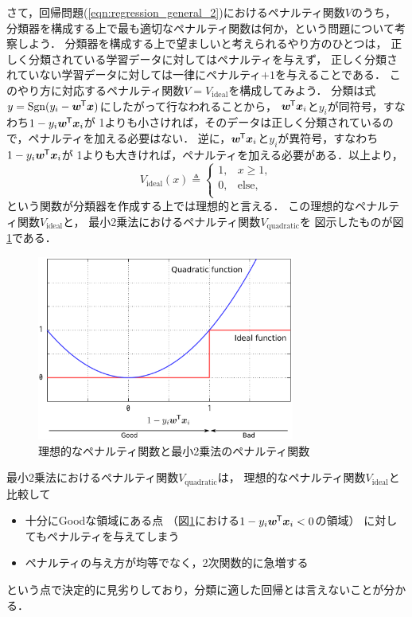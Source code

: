 さて，回帰問題(\ref{eqn:regression_general_2})におけるペナルティ関数$V$のうち，
分類器を構成する上で最も適切なペナルティ関数は何か，という問題について考察しよう．
分類器を構成する上で望ましいと考えられるやり方のひとつは，
正しく分類されている学習データに対してはペナルティを与えず，
正しく分類されていない学習データに対しては一律にペナルティ$+1$を与えることである．
このやり方に対応するペナルティ関数$V = V_{\mathrm{ideal}}$を構成してみよう．
分類は式$y = \operatorname*{Sgn}(y_i - \boldsymbol{w}^{\mkern-1.5mu\mathsf{T}}\boldsymbol{x})$にしたがって行なわれることから，
$\boldsymbol{w}^{\mkern-1.5mu\mathsf{T}}\boldsymbol{x}_i$と$y_i$が同符号，すなわち$1 - y_i \boldsymbol{w}^{\mkern-1.5mu\mathsf{T}}\boldsymbol{x}_i$が
1よりも小さければ，そのデータは正しく分類されているので，ペナルティを加える必要はない．
逆に，$\boldsymbol{w}^{\mkern-1.5mu\mathsf{T}}\boldsymbol{x}_i$と$y_i$が異符号，すなわち$1 - y_i \boldsymbol{w}^{\mkern-1.5mu\mathsf{T}}\boldsymbol{x}_i$が
1よりも大きければ，ペナルティを加える必要がある．以上より，
\begin{equation}
V_{\text{ideal}}(x) \triangleq
\begin{cases}
1, & x \geq 1,    \\
0, & \text{else}, \\
\end{cases}
\end{equation}
という関数が分類器を作成する上では理想的と言える．
この理想的なペナルティ関数$V_{\text{ideal}}$と，
最小2乗法におけるペナルティ関数$V_{\text{quadratic}}$を
図示したものが図\ref{fig:eval_curve_1}である．
\begin{figure}[t]
\centerline{\includegraphics[clip,width=240pt]{figures/eval_curve_1.pdf}}
\caption{理想的なペナルティ関数と最小2乗法のペナルティ関数}
\label{fig:eval_curve_1}
\end{figure}

最小2乗法におけるペナルティ関数$V_{\text{quadratic}}$は，
理想的なペナルティ関数$V_{\text{ideal}}$と比較して
\begin{itemize}
\item 十分にGoodな領域にある点
      （図\ref{fig:eval_curve_1}における$1 - y_i \boldsymbol{w}^{\mkern-1.5mu\mathsf{T}}\boldsymbol{x}_i < 0$の領域）
      に対してもペナルティを与えてしまう
\item ペナルティの与え方が均等でなく，2次関数的に急増する
\end{itemize}
という点で決定的に見劣りしており，分類に適した回帰とは言えないことが分かる．


